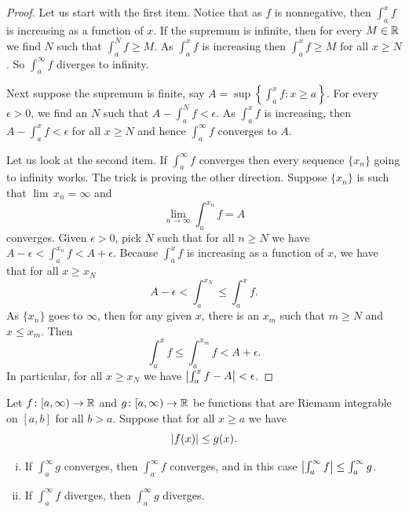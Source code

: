 \begin{proof}
Let us start with the first item.
Notice that as $f$ is nonnegative,
then $\int_a^x f$ is increasing as a function of $x$.
If the supremum is infinite, then for every $M \in {\mathbb{R}}$
we find $N$ such that $\int_a^N f \geq M$.  As $\int_a^x f$
is increasing then $\int_a^x f \geq M$ for all $x \geq N$.  So
$\int_a^\infty f$ diverges to infinity.

Next suppose the supremum is finite, say
$A = \sup \left\{ \int_a^x f : x \geq a \right\}$.
For every $\epsilon > 0$, we find an $N$ such that
$A - \int_a^N f < \epsilon$.  As $\int_a^x f$ is increasing,
then
$A - \int_a^x f < \epsilon$ for all $x \geq N$ and hence
$\int_a^\infty f$ converges to $A$.

Let us look at the second item.
If $\int_a^\infty f$ converges then every sequence $\{ x_n \}$ going to
infinity works.  The trick is
proving the other direction.  Suppose $\{ x_n \}$ is such that $\lim\, x_n =
\infty$ and
\begin{equation*}
\lim_{n\to\infty} \int_a^{x_n} f = A
\end{equation*}
converges.  Given $\epsilon > 0$, pick $N$ such that for
all $n \geq N$ we have
$A - \epsilon < \int_a^{x_n} f < A + \epsilon$.
Because $\int_a^x f$ is increasing as a function of $x$, we have that for all
$x \geq x_N$
\begin{equation*}
A - \epsilon < \int_a^{x_N} \leq \int_a^x f .
\end{equation*}
As $\{ x_n \}$ goes to $\infty$, then for any given
$x$, there is an $x_m$ such that $m \geq N$ and $x \leq x_m$.  Then
\begin{equation*}
\int_a^{x} f \leq \int_a^{x_m} f < A + \epsilon .
\end{equation*}
In particular, for all $x \geq x_N$ we have
$\left\lvert {\int_a^{x} f - A} \right\rvert < \epsilon$.
\end{proof}

\begin{prop}
Let
$f \colon [a,\infty) \to {\mathbb{R}}$ and
$g \colon [a,\infty) \to {\mathbb{R}}$ be functions
that are Riemann integrable on $[a,b]$ for all $b > a$.   Suppose
that for all $x \geq a$ we have
\begin{equation*}
\left\lvert {f(x)} \right\rvert \leq g(x) .
\end{equation*}
\begin{enumerate}[(i)]
\item If $\int_a^\infty g$ converges, then $\int_a^\infty f$ converges,
and in this case 
$\left\lvert {\int_a^\infty f} \right\rvert \leq \int_a^\infty g$.
\item If $\int_a^\infty f$ diverges, then $\int_a^\infty g$ diverges.
\end{enumerate}
\end{prop}


